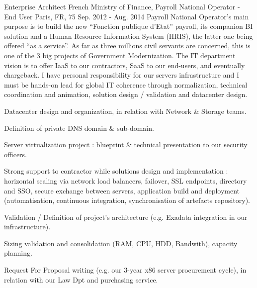 \begin{cventries}
  \cventry
    {Enterprise Architect} %
    {French Ministry of Finance, Payroll National Operator - End User} %
    {Paris, FR, 75} %
    {Sep. 2012 - Aug. 2014} %
{
Payroll National Operator’s main purpose is to build the new “Fonction publique d’Etat” payroll, its companion BI solution and a Human Resource Information System (HRIS), the latter one being offered “as a service”. As far as three millions civil servants are concerned, this is one of the 3 big projects of Government Modernization.
The IT department vision is to offer IaaS to our contractors, SaaS to our end-users, and eventually chargeback.
I have personal responsibility for our servers infrastructure and I must be hands-on lead for global IT coherence through normalization, technical coordination and animation, solution design / validation and datacenter design.
} %
{
      \begin{cvitems} %
        \item {Datacenter design and organization, in relation with Network \& Storage teams.}
        \item {Definition of private DNS domain \& sub-domain.}
        \item {Server virtualization project : blueprint \& technical presentation to our security officers.}
        \item {Strong support to contractor while solutions design and implementation : horizontal scaling via network load balancers, failover, SSL endpoints, directory and SSO, secure exchange between servers, application build and deployment (automatisation, continuous integration, synchronisation of artefacts repository).}
        \item {Validation / Definition of project’s architecture (e.g. Exadata integration in our infrastructure).}
        \item {Sizing validation and consolidation (RAM, CPU, HDD, Bandwith), capacity planning.}
        \item {Request For Proposal writing (e.g. our 3-year x86 server procurement cycle), in relation with our Law Dpt and purchasing service.}
      \end{cvitems}
}%


\end{cventries}
